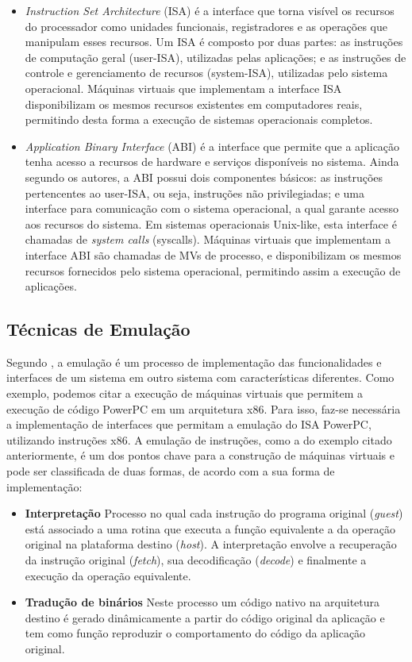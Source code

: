 \documentclass[11pt,twoside]{article}
\begin{document}
\begin{itemize}
 \item \emph{Instruction Set Architecture} (ISA) é a interface que torna visível os recursos do processador como unidades funcionais, registradores e as operações que manipulam esses recursos.    
Um ISA é composto por duas partes: as instruções de computação geral (user-ISA), utilizadas pelas aplicações; e as instruções de controle e gerenciamento de recursos (system-ISA), utilizadas pelo sistema operacional.
Máquinas virtuais que implementam a interface ISA disponibilizam os mesmos recursos existentes em computadores reais, permitindo desta forma a execução de sistemas operacionais completos. 

 \item \emph{Application Binary Interface} (ABI) é a interface que permite que a aplicação tenha acesso a recursos de hardware e serviços disponíveis no sistema\cite{Smith2005a}. 
Ainda segundo os autores, a ABI possui dois componentes básicos: as instruções pertencentes ao user-ISA, ou seja, instruções não privilegiadas; e uma interface para comunicação com o sistema operacional, a qual garante acesso aos recursos do sistema.
Em sistemas operacionais Unix-like, esta interface é chamadas de \emph{system calls} (syscalls). 
Máquinas virtuais que implementam a interface ABI são chamadas de MVs de processo, e disponibilizam os mesmos recursos fornecidos pelo sistema operacional, permitindo assim a execução de aplicações.
\end{itemize}

\subsection{Técnicas de Emulação}
Segundo \cite{Smith2005}, a emulação é um processo de implementação das funcionalidades e interfaces de um sistema em outro sistema com características diferentes. 
Como exemplo, podemos citar a execução de máquinas virtuais que permitem a execução de código PowerPC em um arquitetura x86. 
Para isso, faz-se necessária a implementação de interfaces que permitam a emulação do ISA PowerPC, utilizando instruções x86.
A emulação de instruções, como a do exemplo citado anteriormente, é um dos pontos chave para a construção de máquinas virtuais e pode ser classificada de duas formas, de acordo com a sua forma de implementação:

\begin{itemize}
 \item \textbf{Interpretação} Processo no qual cada instrução do programa original (\emph{guest}) está associado a uma rotina que executa a função equivalente a da operação original na plataforma destino (\emph{host}).
A interpretação envolve a recuperação da instrução original (\emph{fetch}), sua decodificação (\emph{decode}) e finalmente a execução da operação equivalente.
 \item \textbf{Tradução de binários} Neste processo um código nativo na arquitetura destino é gerado dinâmicamente a partir do código original da aplicação e tem como função reproduzir o comportamento do código da aplicação original\cite{Sites1993}. 
\end{itemize}
\end{document}
